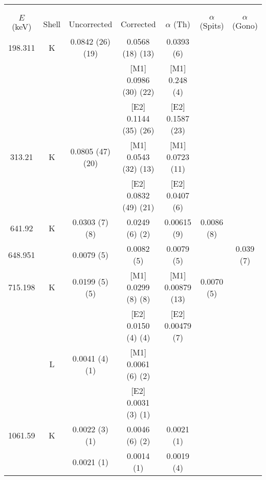\begin{landscape}
\begin{table}
    \centering
\begin{ThreePartTable}
\centering
    \begin{tabular}{>{\footnotesize}c|>{\footnotesize}c|>{\footnotesize}c|>{\footnotesize}c|>{\footnotesize}c|>{\footnotesize}c|>{\footnotesize}c}
        \multicolumn{7}{>{\fontsize{12}{15}}c}{TABLE 4.4 (CONTINUED)}\\
        \multicolumn{7}{>{\fontsize{12}{15}}c}{(b)}\\
        \toprule
        &  & \multicolumn{2}{>{\footnotesize}c|}{$\alpha$ (This Work)} & & \\
        $E$ (keV)	& Shell	&	Uncorrected & Corrected &	$\alpha$  (Th)\citep{kibedi08:_BRICC}	&	$\alpha$ (Spits)\citep{spits96:_154gd} & 	$\alpha$ (Gono)\citep{gono74:_154gd_e0}\\
	    \hline
        198.311	& K &	0.0842	(26) (19)	& 0.0568 (18) (13) & 	0.0393 (6)	&		\\
        &	 & 			&	[M1] 0.0986 (30) (22)	& [M1] 0.248 (4) &\\
        &	&	&		[E2] 0.1144 (35) (26)	& [E2] 0.1587 (23) & \\
	    \hline
        313.21	&	 K	&	0.0805	(47) (20)	 & [M1] 0.0543 (32) (13) &	[M1] 0.0723 (11)	&		\\
        	&	&	&	[E2] 0.0832 (49) (21) &	[E2] 0.0407 (6)	&		\\
        \hline
        641.92	& K &	0.0303 (7) (8)	&	0.0249 (6) (2)	 & 0.00615 (9)  &	0.0086 (8)	\\
        648.951	&		&	0.0079 (5)	&	0.0082 (5) & 0.0079 (5) &  & 0.039 (7)	\\
        \hline
        715.198	& K &	0.0199	(5) (5)	& [M1] 0.0299 (8) (8)	& [M1] 0.00879 (13) 	&	0.0070 (5)	\\
        &				  &	& [E2] 0.0150 (4) (4)	& [E2] 0.00479 (7)		& \\
        &				 L &	0.0041	(4) (1)	&	[M1] 0.0061 (6) (2)	& & 		\\
        &				&				  	&	[E2] 0.0031 (3) (1)	& & 		\\
	    \hline
        1061.59	& K &	0.0022	(3) (1)	&	0.0046 (6) (2) & 0.0021 (1)	&		\\
	    &				&	0.0021 (1) & 0.0014 (1) & 0.0019 (4) &	\\
        \bottomrule
    \end{tabular}

\end{ThreePartTable}
\end{table}
\end{landscape}
